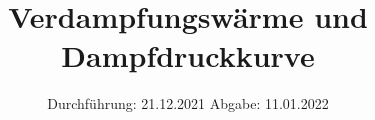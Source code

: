 

\subject{V203}
\title{Verdampfungswärme und Dampfdruckkurve}
\date{%
  Durchführung: 21.12.2021
  \hspace{3em}
  Abgabe: 11.01.2022
}



\maketitle
\thispagestyle{empty}
\tableofcontents
\newpage



\newpage




\printbibliography{}


